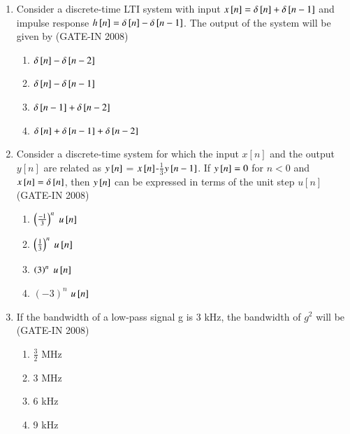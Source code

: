 \documentclass[journal,12pt,onecolumn]{IEEEtran}
\theoremstyle{remark}
\begin{document}
\begin{enumerate}
\item  Consider a discrete-time LTI system with input $x{}\left[n\right] = \delta {}\left[n\right] +\delta{}\left[n-1\right] $ and impulse response $h{}\left[n\right] =\delta{}\left[n\right]-\delta{}\left[n-1\right]$. The output of the system will be given by \hfill{(GATE-IN 2008)}
\begin{multicols}{2}
  \begin{enumerate} 
        \item $\delta{}\left[n\right]-\delta{}\left[n-2\right]$
        \item $\delta{}\left[n\right]-\delta{}\left[n-1\right]$
        \item $\delta{}\left[n-1\right]+\delta{}\left[n-2\right]$
        \item $\delta{}\left[n\right]+\delta{}\left[n-1\right]+\delta{}\left[n-2\right]$
  \end{enumerate}
  \end{multicols}
  
    \item Consider a discrete-time system for which the input $x[n]$ and the output $y[n]$ are related as $y{}\left[n\right]$ = $x{}\left[n\right]$-\(\frac{1}{3}\)$y{}\left[n-1\right]$. If $y{}\left[n\right] = 0$ for $n < 0$ and $x{}\left[n\right] = \delta{}\left[n\right]$, then $y{}\left[n\right]$ can be expressed in terms of the unit step $u[n]$ \hfill{(GATE-IN 2008)}
    \begin{multicols}{4}
    \begin{enumerate} 
      \item $\left(\frac{-1}{3}\right)^{n}$ $u{}\left[n\right]$ 
      \item $\left(\frac{1}{3}\right)^{n}$ $u{}\left[n\right]$
      \item $\left(3\right)^{n}$ $u{}\left[n\right]$
      \item $(-3)^{n}$ $u{}\left[n\right]$
    \end{enumerate}  
    \end{multicols}

    \item  If the bandwidth of a low-pass signal g is 3 kHz, the bandwidth of $g^{2}$ will be    \hfill{(GATE-IN 2008)}
    \begin{multicols}{4}
    \begin{enumerate} 
            \item \(\frac{3}{2}\) MHz 
            \item 3 MHz
            \item 6 kHz
            \item 9 kHz
   \end{enumerate}
   \end{multicols}


\end{enumerate}
\end{document}
